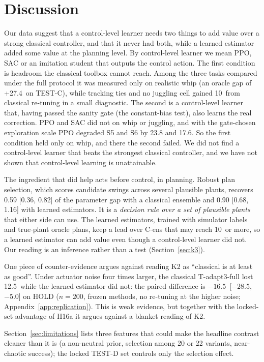 \section{Discussion}
\label{sec:discussion}

Our data suggest that a control-level learner needs two things to add value over a strong classical controller, and that it never had both, while a learned estimator added some value at the planning level. By control-level learner we mean PPO, SAC or an imitation student that outputs the control action. The first condition is headroom the classical toolbox cannot reach. Among the three tasks compared under the full protocol it was measured only on realistic whip (an oracle gap of +27.4\pp\ on TEST-C), while tracking ties and no juggling cell gained 10\pp\ from classical re-tuning in a small diagnostic. The second is a control-level learner that, having passed the sanity gate (the constant-bias test), also learns the real correction. PPO and SAC did not on whip or juggling, and with the gate-chosen exploration scale PPO degraded S5 and S6 by 23.8 and 17.6\pp. So the first condition held only on whip, and there the second failed. We did not find a control-level learner that beats the strongest classical controller, and we have not shown that control-level learning is unattainable.

The ingredient that did help acts before control, in planning. Robust plan selection, which scores candidate swings across several plausible plants, recovers 0.59 [0.36, 0.82] of the parameter gap with a classical ensemble and 0.90 [0.68, 1.16] with learned estimators. It is a \emph{decision rule over a set of plausible plants} that either side can use. The learned estimators, trained with simulator labels and true-plant oracle plans, keep a lead over C-ens that may reach 10\pp\ or more, so a learned estimator can add value even though a control-level learner did not. Our reading is an inference rather than a test (Section~\ref{sec:k3}).

One piece of counter-evidence argues against reading K2 as ``classical is at least as good''. Under actuator noise four times larger, the classical T-adapt3-full lost 12.5\pp\ while the learned estimator did not: the paired difference is $-16.5$\pp\ [$-28.5$, $-5.0$] on HOLD ($n{=}200$, frozen methods, no re-tuning at the higher noise; Appendix~\ref{app:replication}). This is weak evidence, but together with the locked-set advantage of H16a it argues against a blanket reading of K2.

Section~\ref{sec:limitations} lists three features that could make the headline contrast cleaner than it is (a non-neutral prior, selection among 20 or 22 variants, near-chaotic success); the locked TEST-D set controls only the selection effect.


